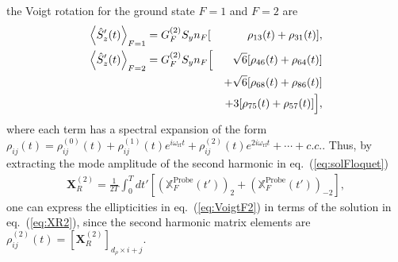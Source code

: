 \documentclass[%
reprint,
 amsmath,amssymb,
 aps,
floatfix,
]{revtex4-1}
\begin{document}
the Voigt rotation for  the ground state $F=1$ and $F=2$ are
\begin{eqnarray}
\Braket{\hat{S}_z'(t)}_{F=1}&=
G_{F}^{(2)} S_y n_F[&\rho_{13}(t)+\rho_{31}(t)]\label{eq:VoigtF1},\\
\Braket{\hat{S}_z'(t)}_{F=2}&=
G_{F}^{(2)} S_y n_F\Big[&\sqrt{6} [\rho_{46}(t)+\rho_{64}(t)]\nonumber\\
& &+\sqrt{6} [\rho_{68}(t)+\rho_{86}(t)]\nonumber\\
& &+3 [\rho_{75}(t)+\rho_{57}(t)]\Big]\label{eq:VoigtF2},
\end{eqnarray}
where each term has a spectral expansion of the form $\rho_{ij}(t)=\rho_{ij}^{(0)}(t)+\rho_{ij}^{(1)}(t)e^{i\omega_\mathrm{rf}t}+\rho_{ij}^{(2)}(t)e^{2i\omega_\mathrm{rf}t}+\cdots+c.c.$.
Thus, by extracting the mode amplitude of the second harmonic in eq.~(\ref{eq:solFloquet})
\begin{align}
\mathbf{X}_{R}^{(2)}=\frac{1}{2T}\int_0^T dt' \left[(\mathbb{X}^{\mathrm{Probe}}_F(t'))_{2}+(\mathbb{X}^{\mathrm{Probe}}_F(t'))_{-2}\right],\label{eq:XR2}
\end{align}
one can express the ellipticities in eq.~(\ref{eq:VoigtF2})
in terms of the solution in eq.~(\ref{eq:XR2}), since the second harmonic matrix elements are $\rho^{(2)}_{ij}(t)=[\mathbf{X}_{R}^{(2)}]_{d_{\rho}\times i +j}$.


\end{document}
